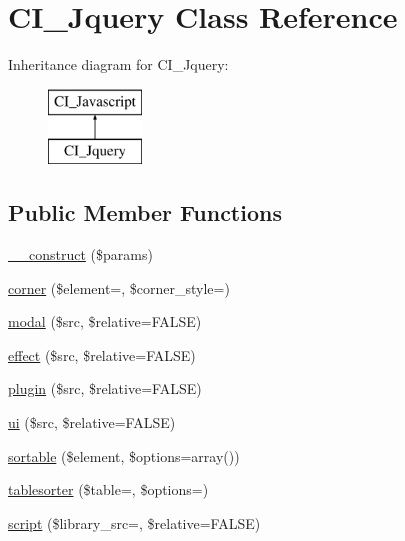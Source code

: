 \hypertarget{class_c_i___jquery}{}\section{C\+I\+\_\+\+Jquery Class Reference}
\label{class_c_i___jquery}
Inheritance diagram for C\+I\+\_\+\+Jquery\+:\begin{figure}[H]
\begin{center}
\leavevmode
\includegraphics[height=2.000000cm]{class_c_i___jquery}
\end{center}
\end{figure}
\subsection*{Public Member Functions}
\begin{DoxyCompactItemize}
\item 
\mbox{\hyperlink{class_c_i___jquery_a1d0af939f40979a61018fca28bd7e143}{\+\_\+\+\_\+construct}} (\$params)
\item 
\mbox{\hyperlink{class_c_i___jquery_a46875a9b59c44f96fae80b3fe172cd9f}{corner}} (\$element=\textquotesingle{}\textquotesingle{}, \$corner\+\_\+style=\textquotesingle{}\textquotesingle{})
\item 
\mbox{\hyperlink{class_c_i___jquery_a516c0da238c6eb221746ece8eabbdc2a}{modal}} (\$src, \$relative=F\+A\+L\+SE)
\item 
\mbox{\hyperlink{class_c_i___jquery_a643c32b574fdba4cb2693d6a2edf24d8}{effect}} (\$src, \$relative=F\+A\+L\+SE)
\item 
\mbox{\hyperlink{class_c_i___jquery_adf78a260877490b76e9343a1ed30f017}{plugin}} (\$src, \$relative=F\+A\+L\+SE)
\item 
\mbox{\hyperlink{class_c_i___jquery_a7bbc9397874239df91f71588bc832108}{ui}} (\$src, \$relative=F\+A\+L\+SE)
\item 
\mbox{\hyperlink{class_c_i___jquery_a7e0c7e541a7454863daf6b2114cd1608}{sortable}} (\$element, \$options=array())
\item 
\mbox{\hyperlink{class_c_i___jquery_a96a76be908573d0ad057e68d15777d79}{tablesorter}} (\$table=\textquotesingle{}\textquotesingle{}, \$options=\textquotesingle{}\textquotesingle{})
\item 
\mbox{\hyperlink{class_c_i___jquery_a6f743151057fba667af8c0248ee33aab}{script}} (\$library\+\_\+src=\textquotesingle{}\textquotesingle{}, \$relative=F\+A\+L\+SE)
\end{DoxyCompactItemize}
